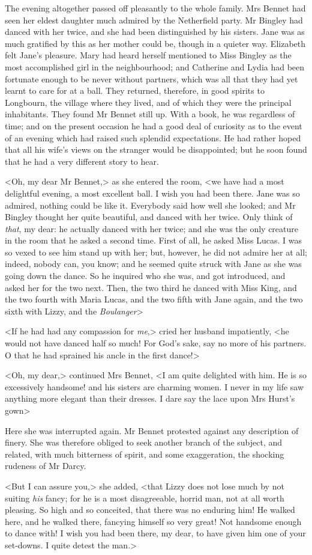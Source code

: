 The evening altogether passed off pleasantly to the whole family. Mrs Bennet had seen her eldest daughter much admired by the Netherfield party. Mr Bingley had danced with her twice, and she had been distinguished by his sisters. Jane was as much gratified by this as her mother could be, though in a quieter way. Elizabeth felt Jane's pleasure. Mary had heard herself mentioned to Miss Bingley as the most accomplished girl in the neighbourhood; and Catherine and Lydia had been fortunate enough to be never without partners, which was all that they had yet learnt to care for at a ball. They returned, therefore, in good spirits to Longbourn, the village where they lived, and of which they were the principal inhabitants. They found Mr Bennet still up. With a book, he was regardless of time; and on the present occasion he had a good deal of curiosity as to the event of an evening which had raised such splendid expectations. He had rather hoped that all his wife's views on the stranger would be disappointed; but he soon found that he had a very different story to hear.

<Oh, my dear Mr Bennet,> as she entered the room, <we have had a most delightful evening, a most excellent ball. I wish you had been there. Jane was so admired, nothing could be like it. Everybody said how well she looked; and Mr Bingley thought her quite beautiful, and danced with her twice. Only think of \textit{that}, my dear: he actually danced with her twice; and she was the only creature in the room that he asked a second time. First of all, he asked Miss Lucas. I was so vexed to see him stand up with her; but, however, he did not admire her at all; indeed, nobody can, you know; and he seemed quite struck with Jane as she was going down the dance. So he inquired who she was, and got introduced, and asked her for the two next. Then, the two third he danced with Miss King, and the two fourth with Maria Lucas, and the two fifth with Jane again, and the two sixth with Lizzy, and the \textit{Boulanger}\longdash>

<If he had had any compassion for \textit{me},> cried her husband impatiently, <he would not have danced half so much! For God's sake, say no more of his partners. O that he had sprained his ancle in the first dance!>

<Oh, my dear,> continued Mrs Bennet, <I am quite delighted with him. He is so excessively handsome! and his sisters are charming women. I never in my life saw anything more elegant than their dresses. I dare say the lace upon Mrs Hurst's gown\longdash>

Here she was interrupted again. Mr Bennet protested against any description of finery. She was therefore obliged to seek another branch of the subject, and related, with much bitterness of spirit, and some exaggeration, the shocking rudeness of Mr Darcy.

<But I can assure you,> she added, <that Lizzy does not lose much by not suiting \textit{his} fancy; for he is a most disagreeable, horrid man, not at all worth pleasing. So high and so conceited, that there was no enduring him! He walked here, and he walked there, fancying himself so very great! Not handsome enough to dance with! I wish you had been there, my dear, to have given him one of your set-downs. I quite detest the man.>
